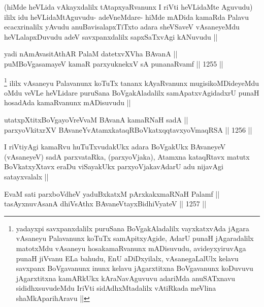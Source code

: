 \begin{artha}
(hiMde heVLida vAkayxdalilx tAtapxyaRvanunx I riVti heVLidaMte Aguvudu) ililx idu heVLidaMtAguvudu- adeVneMdare- hiMde mADida kamaRda Palavu ecacxrinalilx yAvudu anuBavisalapxTiTxto adara sheVSaveV vAsaneyeMdu heVLalapxDuvudu adeV savxpanxdalilx sapxSaTxvAgi kANuvudu ||
\end{artha}


\begin{shl}
yadi nAmAvasitAthAR PalaM datetxvXVha BAvanA || \\
puMBoVgasamayeV kamaR parxyuknekxV sA punanaRvamf ||  1255 ||  
\end{shl}

\begin{artha}
\footnote{yadayxpi savxpanxdalilx puruSana BoVgakAladalilx vayxkatxvAda jAgara vAsaneyu Palavanunx koTuTx samApitxyAgide, AdarU punaH jAgaradalilx matotxMdu vAsaneyu hosakamaRvanunx mADisuvudu, avideyxyiruvAga punaH jiVvanu ELa bahudu, EnU aDiDxyilalx, vAsanegaLalUlx kelavu savxpanx BoVgavanunx inunx kelavu jAgarxtitxna BoVgavanunx koDuvuvu jAgarxtitxna kamARkUkx kAraNavAguvuvu adariMda anuSATxnavu sididhxsuvudeMdu IriVti sidAdhxMtadalilx vAtiRkada meVlina shaMkAparihAravu ||}
ililx vAsaneyu Palavanunx koTuTx tananx kAyaRvanunx mugisikoMDideyeMdu oMdu veVLe heVLidare puruSana BoVgakAladalilx samApatxvAgidadxrU punaH hosadAda kamaRvanunx mADisuvudu ||
\end{artha}

\begin{shl}
utatxpXtitxBoVgayoVreVvaM BAvanA kamaRNaH sadA || \\
parxyoVkitxrXV BAvaneYvA\s \s tamxkataqRBoVkatxqqtavxyoVmaqRSA ||  1256 ||  
\end{shl}

\begin{artha}
I riVtiyAgi kamaRvu huTuTxvudakUkx adara BoVgakUkx BAvaneyeV (vAsaneyeV) sadA parxvataRka, (parxyoVjaka), Atamxna kataqRtavx matutx BoVkatxyXtavx eraDu viSayakUkx parxyoVjakavAdarU adu nijavAgi satayxvalalx ||
\end{artha}


\begin{shl}
EvaM sati parxboVdheV yaduBxkatxM pArxkakxmaRNaH Palamf || \\
tasAyxnuvAsanA dhiVsAthx BAvaneVtayxBidhiVyateV ||  1257 ||  
\end{shl}


